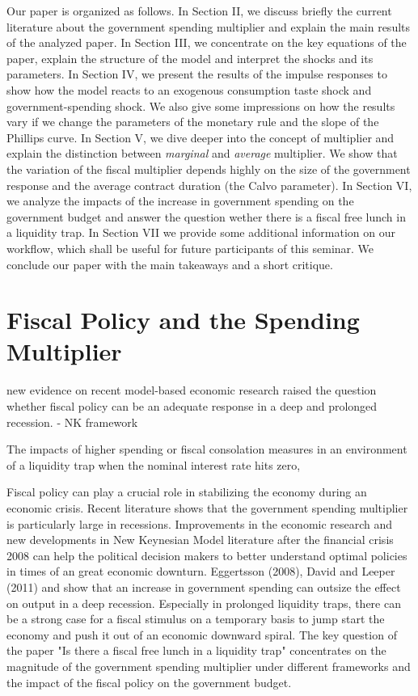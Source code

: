 \documentclass[12pt,a4paper,oneside,titlepage]{article}
\begin{document}
Our paper is organized as follows. In Section II, we discuss briefly the current literature about the government spending multiplier and explain the main results of the analyzed paper. In Section III, we concentrate on the key equations of the paper, explain the structure of the model and interpret the shocks and its parameters. In Section IV, we present the results of the impulse responses to show how the model reacts to an exogenous consumption taste shock and government-spending shock. We also give some impressions on how the results vary if we change the parameters of the monetary rule and the slope of the Phillips curve. In Section V, we dive deeper into the concept of multiplier and explain the distinction between \textit{marginal} and \textit{average} multiplier. We show that the variation of the fiscal multiplier depends highly on the size of the government response and the average contract duration (the Calvo parameter). In Section VI, we analyze the impacts of the increase in government spending on the government budget and answer the question wether there is a fiscal free lunch in a liquidity trap. In Section VII we provide some additional information on our workflow, which shall be useful for future participants of this seminar. We conclude our paper with the main takeaways and a short critique.


\section{Fiscal Policy and the Spending Multiplier }

new evidence on recent model-based economic research raised the question whether fiscal policy can be an adequate response in a deep and prolonged recession.
- NK framework

The impacts of higher spending or fiscal consolation measures in an environment of a liquidity trap when the nominal interest rate hits zero,

Fiscal policy can play a crucial role in stabilizing the economy during an economic crisis. Recent literature shows that the government spending multiplier is particularly large in recessions. Improvements in the economic research and new developments in New Keynesian Model literature after the financial crisis 2008 can help the political decision makers to better understand optimal policies in times of an great economic downturn. Eggertsson (2008), David and Leeper (2011) and \citet{Christiano.2011} show that an increase in government spending can outsize the effect on output in a deep recession. Especially in prolonged liquidity traps, there can be a strong case for a fiscal stimulus on a temporary basis to jump start the economy and push it out of an economic downward spiral.
The key question of the paper "Is there a fiscal free lunch in a liquidity trap" concentrates on the magnitude of the government spending multiplier under different frameworks and the impact of the fiscal policy on the government budget.
\end{document}
